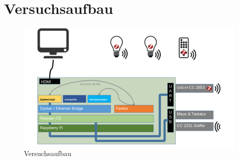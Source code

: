 \chapter{Versuchsaufbau}

\begin{figure}[H]
    \centering
    \includegraphics[width=1\textwidth]{media/Versuchsaufbau/image1.png}
    \caption{Versuchsaufbau}
  \end{figure}